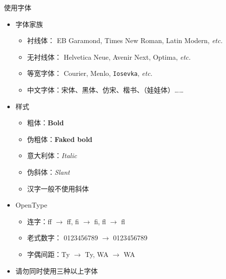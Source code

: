 \begin{frame}{使用字体}
\begin{itemize}
  \item<1-> 字体家族
    \begin{itemize}
      \item 衬线体：
        {\EBGaramond EB Garamond},
        {\TimesNewRoman Times New Roman},
        {\LatinRoman Latin Modern}, \emph{etc.}
      \item 无衬线体：
        {\Helvetica Helvetica Neue},
        {\Avenir Avenir Next},
        {\Optima Optima}, \emph{etc.}
      \item 等宽字体：
        {\Courier Courier},
        {\Menlo Menlo},
        \texttt{Iosevka}, \emph{etc.}
      \item 中文字体：宋体、{\HeiTi 黑体}、{\FangSong 仿宋}、{\KaiTi 楷书}、{\WaWa （娃娃体）}……
    \end{itemize}
  \item<2-> 样式
    \begin{itemize}
      \item 粗体：\textbf{Bold}
      \item 伪粗体：{\textbf{Faked bold}}
      \item 意大利体：\textit{Italic}
      \item 伪斜体：{\textsl{Slant}}
      \item<3-> \alert{汉字一般不使用斜体}
    \end{itemize}
  \item<4-> OpenType
    \begin{itemize}
      \item 连字：{f}{f} $\to$ ff, {f}{i} $\to$ fi, {f}{l} $\to$ fl
      \item 老式数字：
        0123456789 $\to$ {0123456789}
      \item 字偶间距：{T}{y} $\to$ Ty, {W}{A} $\to$ WA
    \end{itemize}
  \item<5-> \alert{请勿同时使用三种以上字体}
\end{itemize}
\vspace{-0.2cm}
\end{frame}
